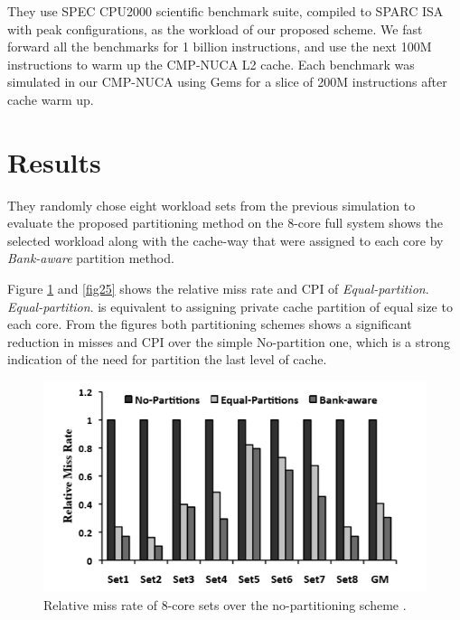 \documentclass{report}
\begin{document}
They use SPEC CPU2000  scientiﬁc benchmark suite, compiled to SPARC ISA with peak conﬁgurations, as the workload of our proposed scheme. We fast forward all the benchmarks for 1 billion instructions, and use the next 100M instructions to warm up the CMP-NUCA L2 cache. Each benchmark was simulated in our CMP-NUCA using Gems for a slice of 200M instructions after cache warm up.\vspace{2cm}



 \section{Results}
\vspace{1cm}
They randomly chose eight workload sets from the previous simulation to evaluate the proposed partitioning method on the $8$-core full system shows the selected workload along with the cache-way that were assigned to each core by \emph{Bank-aware} partition method.\vspace{.8cm}

Figure \ref{fig24} and  \ref{fig25} shows the relative miss rate and CPI of \emph{Equal-partition}. \emph{Equal-partition}. is equivalent to assigning private cache partition of equal size to each core. From the figures both partitioning schemes shows a significant reduction in misses and CPI over the simple No-partition one, which is a strong indication of the need for partition the last level of cache.
\vspace{2cm}
\begin{figure}[h!]
\includegraphics[width=1\textwidth]{./fig24}
\caption{  Relative miss rate of $8$-core sets over the no-partitioning scheme .}
\label{fig24}
\end{figure}
\vspace{2.5cm}
\end{document}
